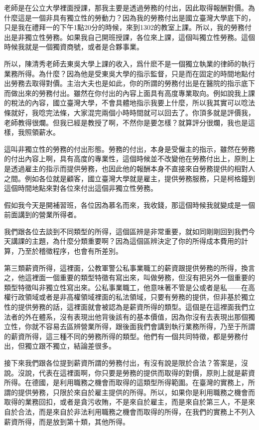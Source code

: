 \documentclass[oneside,sub3section]{ctexbook}
\begin{document}
老師是在公立大學裡面授課，那我主要是透過勞務的付出，因此取得報酬對價。為什麼這是一個非具有獨立性的勞動力？因為我的勞務付出是國立臺灣大學底下的，只是我在禮拜一的下午1點20分的時候，來到1302的教室上課。所以，我的勞務付出是非獨立性勞務。如果我自己開班授課，各位來上課，這個叫獨立性勞務。這個時候我就是一個獨資商號，或者是合夥事業。

所以，陳清秀老師去東吳大學上課的收入，爲什麽不是一個獨立執業的律師的執行業務所得。為什麼？因為他是受東吳大學的指示監督，只是而在固定的時間地點付出勞務去取得對價。主治大夫也是如此，你的所謂的勞務付出是在醫院的指示底下而做出來的勞務付出。雖然在你付出的內容上面具有高度專業取向。例如說我上課的稅法的內容，國立臺灣大學，不會具體地指示我要上什麼，所以我其實可以唸法條就好，我唸完法條，大家混完兩個小時時間就可以回去了。你頂多就是評價我，老師教得很爛。但我已經是教授了啊，不然你是要怎樣？就算評分很爛，我也是這樣，我照領薪水。

這叫非獨立性的勞務的付出形態。勞務的付出，本身是受僱主的指示，雖然在勞務的付出內容上啊，具有高度的專業性，這個時候並不改變他在勞務付出上，原則上是透過雇主的指示而提供勞務，也因此他的報酬本身不直接來自勞務提供的相對人之間。例如各位就是顧客，國立臺灣大學就是雇主，提供勞務服務，只是柯格鐘到這個時間地點來對各位來付出這個非獨立性勞務。

假如我今天是開補習班，各位因為慕名而來，我收錢，那這個時候我就變成是一個前面講到的營業所得者。

我們跟各位去談到不同類型的所得，這個區辨是非常重要，就如同剛剛回到我們今天講課的主題，為什麼分類重要啊？因為這個區辨決定了你的所得成本費用的計算，乃至於稽徵程序，也會有所差別。

第三類薪資所得，這裡面，公教軍警公私事業職工的薪資跟提供勞務的所得，換言之，他這裡面一個重要的類型特徵有寫出來，叫做勞務，但沒有把另外一個重要的類型特徵叫非獨立性寫出來。公私事業職工，他意味著不管是公或者是私------在高權行政領域或者是非高權領域裡面的私法領域，只要有勞務的提供，但非基於獨立性的提供勞務的話，這裡面就會被認為是薪資所得的類型。這個是在這裡面我們立法者的外在體系，沒有表現出他背後該有的基本價值，因為你沒有去表現出那個獨立性，你就不容易去區辨營業所得，跟後面我們會講到執行業務所得，乃至于所謂的薪資所得，這三種不同的勞務所得的類型。他們有一個共同特徵，都是勞務付出，但獨立跟不獨立，結論差很多。

接下來我們跟各位提到薪資所謂的勞務付出，有沒有說是限於合法？答案是，沒說。沒說，代表在這裡面啊，你只要是勞務的提供而取得的對價，原則上就是薪資所得。在德國，是利用職務之機會而取得的這類型所得範圍。在臺灣的實務上，所謂的提供勞務，只限於來自於雇主提供的所得。所以，如果你是利用職務之機會而取得的業務回扣，或者是貪污收賄，不是來自於雇主，而是來自於第三人，不是來自於合法，而是來自於非法利用職務之機會而取得的所得，在我們的實務上不列入薪資所得，而是放到第十類，其他所得。
\end{document}

